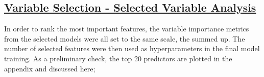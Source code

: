 \subsection{\hyperref[appendix:electricity:sv]{Variable Selection - Selected Variable Analysis}}
In order to rank the most important features, the variable importance metrics from the selected models were all set to the same scale, the summed up.  The number of selected features were then used as hyperparameters in the final model training.  As a preliminary check, the top 20 predictors are plotted in the appendix and discussed here;



